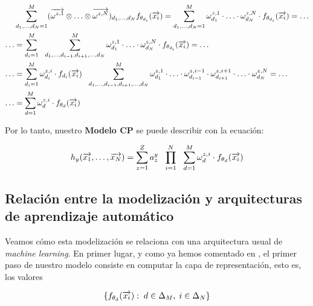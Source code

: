 \begin{equation}
	\begin{split}
		&\sum_{d_1, \ldots, d_N = 1}^{M}  (\overrightarrow{\omega^{z, 1}} \otimes \ldots \otimes \overrightarrow{\omega^{z, N}})_{d_1, \ldots, d_N}  f_{\theta_{d_i}}(\overrightarrow{x_i}) = \sum_{d_1, \ldots, d_N = 1}^{M} \omega^{z, 1}_{d_1} \cdot \ldots \cdot \omega^{z, N}_{d_N} \cdot f_{\theta_{d_i}}(\overrightarrow{x_i}) = \ldots \\
		\ldots &= \sum_{d_i = 1}^M \ \  \sum_{d_1, \ldots, d_{i -1}, d_{i+1}, \ldots, d_N}^M \omega^{z, 1}_{d_1} \cdot \ldots \cdot \omega^{z, N}_{d_N} \cdot f_{\theta_{d_i}}(\overrightarrow{x_i}) = \ldots \\
		\ldots &= \sum_{d_i = 1}^M \omega_{d_i}^{z, i} \cdot f_{d_i}(\overrightarrow{x_i}) \ \  \sum_{d_1, \ldots, d_{i -1}, d_{i+1}, \ldots, d_N}^M \omega^{z, 1}_{d_1} \cdot \ldots \cdot \omega^{z, i-1}_{d_{i-1}} \cdot \omega^{z, i+1}_{d_{i+1}} \cdot \ldots \cdot \omega^{z, N}_{d_N}= \ldots \\
		\ldots &= \sum_{d = 1}^{M} \omega_d^{z,i}  \cdot f_{\theta_{d}}(\overrightarrow{x_i})
	\end{split}
\end{equation}

Por lo tanto, nuestro \textbf{Modelo CP} se puede describir con la ecuación:

\begin{equation} \label{eq:cp_model}
	h_y(\overrightarrow{x_1}, \ldots, \overrightarrow{x_N}) =  \sum_{z = 1}^Z a_z^y \ \  \prod_{i = 1}^N \ \  \sum_{d = 1}^{M} \omega^{z, i}_d \cdot f_{\theta_{d}}(\overrightarrow{x_i})
\end{equation}

\subsection{Relación entre la modelización y arquitecturas de aprendizaje automático}

Veamos cómo esta modelización se relaciona con una arquitectura usual de \textit{machine learning}. En primer lugar, y como ya hemos comentado en , el primer paso de nuestro modelo consiste en computar la capa de representación, esto es, los valores

\begin{equation}
	\{f_{\theta_d}(\overrightarrow{x_i}) : \; d \in \Delta_{M}, \; i \in \Delta_{N} \}
\end{equation}

